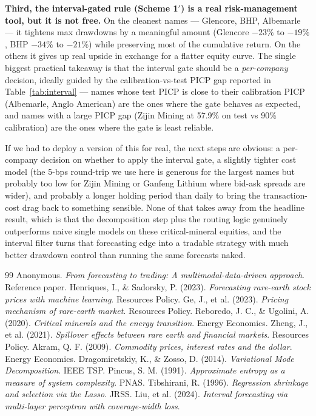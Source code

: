 \documentclass[11pt,a4paper]{article}
\begin{document}
\textbf{Third, the interval-gated rule (Scheme 1$'$) is a real risk-management tool, but it is not free.} On the cleanest names --- Glencore, BHP, Albemarle --- it tightens max drawdowns by a meaningful amount (Glencore $-23\%$ to $-19\%$, BHP $-34\%$ to $-21\%$) while preserving most of the cumulative return. On the others it gives up real upside in exchange for a flatter equity curve. The single biggest practical takeaway is that the interval gate should be a \emph{per-company} decision, ideally guided by the calibration-vs-test PICP gap reported in Table~\ref{tab:interval} --- names whose test PICP is close to their calibration PICP (Albemarle, Anglo American) are the ones where the gate behaves as expected, and names with a large PICP gap (Zijin Mining at 57.9\% on test vs 90\% calibration) are the ones where the gate is least reliable.

If we had to deploy a version of this for real, the next steps are obvious: a per-company decision on whether to apply the interval gate, a slightly tighter cost model (the 5-bps round-trip we use here is generous for the largest names but probably too low for Zijin Mining or Ganfeng Lithium where bid-ask spreads are wider), and probably a longer holding period than daily to bring the transaction-cost drag back to something sensible. None of that takes away from the headline result, which is that the decomposition step plus the routing logic genuinely outperforms naive single models on these critical-mineral equities, and the interval filter turns that forecasting edge into a tradable strategy with much better drawdown control than running the same forecasts naked.

\begin{thebibliography}{99}
 Anonymous. \textit{From forecasting to trading: A multimodal-data-driven approach}. Reference paper.
 Henriques, I., \& Sadorsky, P. (2023). \textit{Forecasting rare-earth stock prices with machine learning}. Resources Policy.
 Ge, J., et al. (2023). \textit{Pricing mechanism of rare-earth market}. Resources Policy.
 Reboredo, J. C., \& Ugolini, A. (2020). \textit{Critical minerals and the energy transition}. Energy Economics.
 Zheng, J., et al. (2021). \textit{Spillover effects between rare earth and financial markets}. Resources Policy.
 Akram, Q. F. (2009). \textit{Commodity prices, interest rates and the dollar}. Energy Economics.
 Dragomiretskiy, K., \& Zosso, D. (2014). \textit{Variational Mode Decomposition}. IEEE TSP.
 Pincus, S. M. (1991). \textit{Approximate entropy as a measure of system complexity}. PNAS.
 Tibshirani, R. (1996). \textit{Regression shrinkage and selection via the Lasso}. JRSS.
 Liu, et al. (2024). \textit{Interval forecasting via multi-layer perceptron with coverage-width loss}.
\end{thebibliography}
\end{document}
